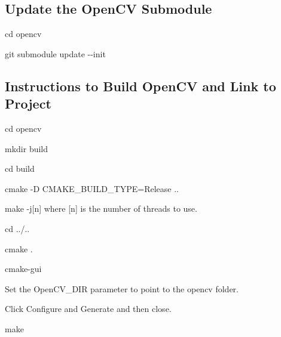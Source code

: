 \subsection*{Update the Open\+CV Submodule}


\begin{DoxyEnumerate}
\item {\ttfamily cd opencv}
\item {\ttfamily git submodule update -\/-\/init}
\end{DoxyEnumerate}

\subsection*{Instructions to Build Open\+CV and Link to Project}


\begin{DoxyEnumerate}
\item {\ttfamily cd opencv}
\item {\ttfamily mkdir build}
\item {\ttfamily cd build}
\item {\ttfamily cmake -\/D C\+M\+A\+K\+E\+\_\+\+B\+U\+I\+L\+D\+\_\+\+T\+Y\+PE=Release ..}
\item {\ttfamily make -\/j\mbox{[}n\mbox{]}} where {\ttfamily \mbox{[}n\mbox{]}} is the number of threads to use.
\item {\ttfamily cd ../..}
\item {\ttfamily cmake .}
\item {\ttfamily cmake-\/gui}
\item Set the {\ttfamily Open\+C\+V\+\_\+\+D\+IR} parameter to point to the {\ttfamily opencv} folder.
\item Click {\ttfamily Configure} and {\ttfamily Generate} and then close.
\item {\ttfamily make} 
\end{DoxyEnumerate}